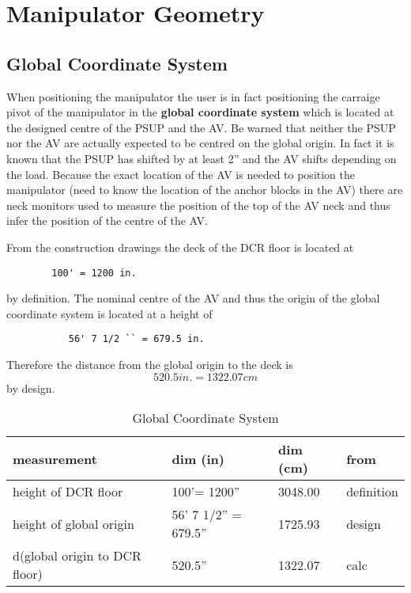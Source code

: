 
  
\chapter{Manipulator Geometry}
  
\section{Global Coordinate System}
  When positioning the manipulator the user is in fact positioning the
carraige pivot of the manipulator in the {\bf global coordinate system}
which is located at the designed centre of the PSUP and the AV.  Be
warned that neither the PSUP nor the AV are actually expected to be centred
on the global origin. In fact it is known that the PSUP has shifted by
at least 2'' and the AV shifts depending on the load.  Because the exact
location of the AV is needed to position the manipulator (need to know the
location of the anchor blocks in the AV) there are neck monitors used
to measure the position of the top of the AV neck and thus infer the position
of the centre of the AV.
  
  From the construction drawings the deck of the DCR
floor is located at
\begin{verbatim}
        100' = 1200 in.
\end{verbatim}
by definition.  The nominal centre of the AV 
and thus the origin of the global coordinate system is located at a height
of 
\begin{verbatim}
           56' 7 1/2 `` = 679.5 in.
\end{verbatim}
Therefore the distance from the global origin to the deck is
\[
        520.5 in. = 1322.07 cm
\]
by design.
  
\begin{table}[htbp]
\begin{center}
\begin{tabular}{|l|l|l|l|}
\hline
measurement                  & dim (in)     & dim (cm)        & from
\\ \hline
height of DCR floor          & 100'= 1200'' & 3048.00         & definition \\
height of global origin      & 56' 7 1/2'' = 679.5'' & 1725.93 & design \\
d(global origin to DCR floor)& 520.5''               & 1322.07 & calc \\
\hline
\end{tabular}
\caption[Global Coordinate System]
        {Global Coordinate System
        }
\end{center}
\end{table}
  
